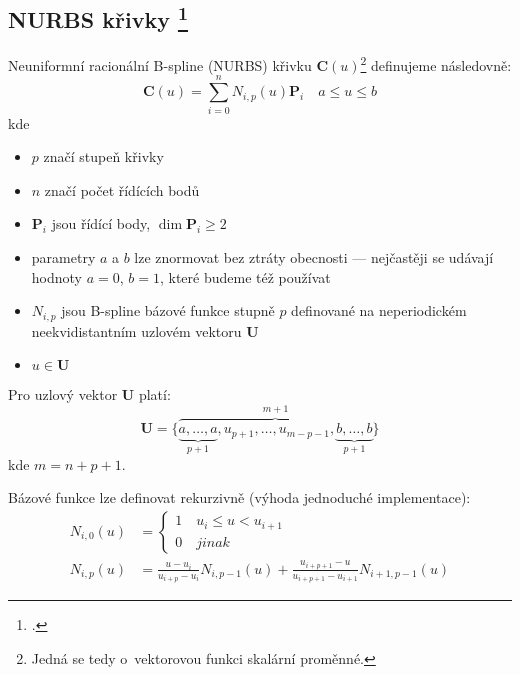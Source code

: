 \subsection[NURBS křivky]{NURBS křivky \footcite[kapitola 3.2]{The_NURBS_Book}}\label{section: NURBS křivky}
Neuniformní racionální B-spline (NURBS) křivku $\bm{C}(u)$\footnote{Jedná se tedy o~vektorovou funkci skalární proměnné.} definujeme následovně:
\begin{equation}
    \bm{C}(u) = \sum_{i = 0}^{n} N_{i, p}(u)\bm{P}_i\quad a\le u \le b
\end{equation}
kde
\begin{itemize}
    \item $p$ značí stupeň křivky
    \item $n$ značí počet řídících bodů
    \item $\bm{P}_i$ jsou řídící body, $\dim{\bm{P}_i} \ge 2$
    \item parametry $a$ a $b$ lze znormovat bez ztráty obecnosti --- nejčastěji se udávají hodnoty
          $a = 0$, $b = 1$, které budeme též používat
    \item $N_{i,p}$ jsou B-spline bázové funkce stupně $p$ definované
          na neperiodickém neekvidistantním uzlovém vektoru $\bm{U}$
    \item $u \in \bm{U}$
\end{itemize}
Pro uzlový vektor $\bm{U}$ platí:
\begin{equation}
    \bm{U} = \{\overbrace{\underbrace{a, \ldots, a}_{p + 1}, u_{p + 1}, \ldots, u_{m -p - 1}, \underbrace{b, \ldots, b}_{p + 1}}^{m + 1}\}
\end{equation}
kde $m = n + p + 1$.\par
Bázové funkce lze definovat rekurzivně (výhoda jednoduché implementace):
\begin{align}
    N_{i,0}(u)  & = \begin{cases}
                        1 \quad u_i \le u < u_{i + 1} \\
                        0 \quad jinak
                    \end{cases}                \nonumber         \\
    N_{i, p}(u) & = \frac{u - u_i}{u_{i + p} - u_i}N_{i,p- 1}(u)
    + \frac{u_{i + p + 1} - u}{u_{i + p + 1} - u_{i + 1}}N_{i + 1, p - 1}(u)\label{eq:bázová funkce}
\end{align}